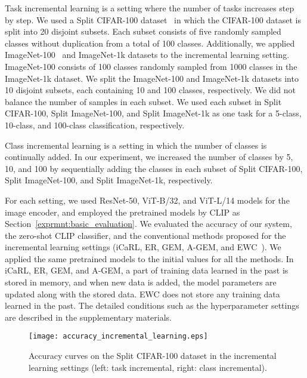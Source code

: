 \documentclass[runningheads]{llncs}
\begin{document}
Task incremental learning is a setting where the number of tasks increases step by step.
We used a Split CIFAR-100 dataset~\cite{AGEM,SplitCIFAR100} in which the CIFAR-100 dataset is split into 20 disjoint subsets.
Each subset consists of five randomly sampled classes without duplication from a total of 100 classes.
Additionally, we applied ImageNet-100~\cite{ImageNet100,ImageNet100_2,PODNet} and ImageNet-1k datasets to the incremental learning setting.
ImageNet-100 consists of 100 classes randomly sampled from 1000 classes in the ImageNet-1k dataset.
We split the ImageNet-100 and ImageNet-1k datasets into 10 disjoint subsets, each containing 10 and 100 classes, respectively.
We did not balance the number of samples in each subset.
We used each subset in Split CIFAR-100, Split ImageNet-100, and Split ImageNet-1k as one task for a 5-class, 10-class, and 100-class classification, respectively.


Class incremental learning is a setting in which the number of classes is continually added.
In our experiment, we increased the number of classes by 5, 10, and 100 by sequentially adding the classes in each subset of Split CIFAR-100, Split ImageNet-100, and Split ImageNet-1k, respectively.

For each setting,
we used ResNet-50, ViT-B/32, and ViT-L/14 models for the image encoder, and employed the pretrained models by CLIP as Section~\ref{exprmnt:basic_evaluation}.
We evaluated the accuracy of our system, the zero-shot CLIP classifier,
and the conventional methods proposed for the incremental learning settings (iCaRL, ER, GEM, A-GEM, and EWC~\cite{iCaRL,ER,GEM,AGEM,EWC}).
We applied the same pretrained models to the initial values for all the methods.
In iCaRL, ER, GEM, and A-GEM, a part of training data learned in the past is stored in memory, and when new data is added, the model parameters are updated along with the stored data.
EWC does not store any training data learned in the past. 
The detailed conditions such as the hyperparameter settings are described in the supplementary materials.\\

\begin{figure}[t]
   \begin{center}
   \texttt{[image: accuracy\_incremental\_learning.eps]}
   \end{center}
   \caption{Accuracy curves on the Split CIFAR-100 dataset in the incremental learning settings (left: task incremental, right: class incremental).}
   \label{fig:accuracy_inclearn}
\end{figure}
\end{document}
